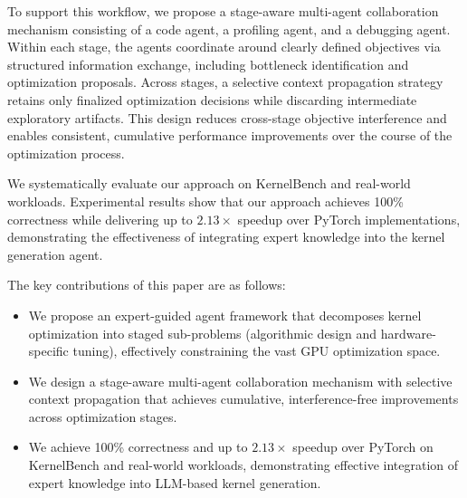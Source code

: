  To support this workflow, we propose a stage-aware multi-agent collaboration mechanism consisting of a code agent, a profiling agent, and a debugging agent. Within each stage, the agents coordinate around clearly defined objectives via structured information exchange, including bottleneck identification and optimization proposals. Across stages, a selective context propagation strategy retains only finalized optimization decisions while discarding intermediate exploratory artifacts. This design reduces cross-stage objective interference and enables consistent, cumulative performance improvements over the course of the optimization process.

We systematically evaluate our approach on KernelBench and real-world workloads. Experimental results show that our approach achieves 100\% correctness while delivering up to $2.13\times$ speedup over PyTorch implementations, demonstrating the effectiveness of integrating expert knowledge into the kernel generation agent.

The key contributions of this paper are as follows:
\begin{itemize}
\item We propose an expert-guided agent framework that decomposes kernel optimization into staged sub-problems (algorithmic design and hardware-specific tuning), effectively constraining the vast GPU optimization space.

\item We design a stage-aware multi-agent collaboration mechanism with selective context propagation that achieves cumulative, interference-free improvements across optimization stages.

\item We achieve 100\% correctness and up to $2.13\times$ speedup over PyTorch on KernelBench and real-world workloads, demonstrating effective integration of expert knowledge into LLM-based kernel generation.
\end{itemize}
